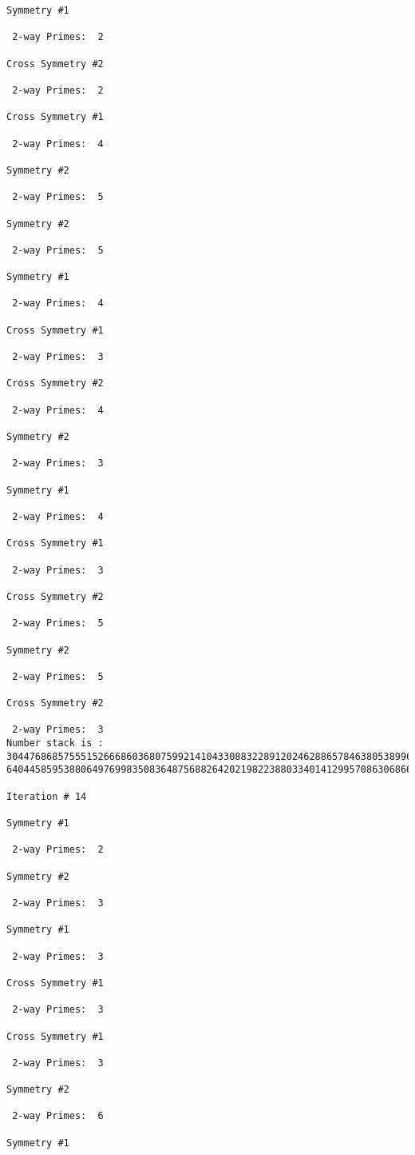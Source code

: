 {{{{\begin{verbatim}
Symmetry #1

 2-way Primes: 	2

Cross Symmetry #2

 2-way Primes: 	2

Cross Symmetry #1

 2-way Primes: 	4

Symmetry #2

 2-way Primes: 	5

Symmetry #2

 2-way Primes: 	5

Symmetry #1

 2-way Primes: 	4

Cross Symmetry #1

 2-way Primes: 	3

Cross Symmetry #2

 2-way Primes: 	4

Symmetry #2

 2-way Primes: 	3

Symmetry #1

 2-way Primes: 	4

Cross Symmetry #1

 2-way Primes: 	3

Cross Symmetry #2

 2-way Primes: 	5

Symmetry #2

 2-way Primes: 	5

Cross Symmetry #2

 2-way Primes: 	3
Number stack is :
30447686857555152666860368075992141043308832289120246288657846380538996794608835958544046240163340857
64044585953880649769983508364875688264202198223880334014129957086306866625155575868674403758043361042

Iteration #	14

Symmetry #1

 2-way Primes: 	2

Symmetry #2

 2-way Primes: 	3

Symmetry #1

 2-way Primes: 	3

Cross Symmetry #1

 2-way Primes: 	3

Cross Symmetry #1

 2-way Primes: 	3

Symmetry #2

 2-way Primes: 	6

Symmetry #1


\end{verbatim}}}}}
